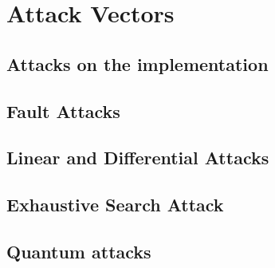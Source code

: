 \chapter{Attack Vectors}

\section{Attacks on the implementation}
\section{Fault Attacks}
\section{Linear and Differential Attacks}
\section{Exhaustive Search Attack}

\section{Quantum attacks}
